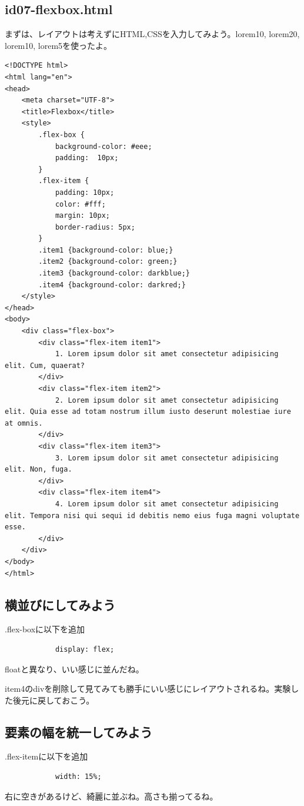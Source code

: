 \documentclass[mingoth,11pt,a4j,uplatex,dvipdfmx]{jsarticle}
\begin{document}
\subsection{id07-flexbox.html}
まずは、レイアウトは考えずにHTML,CSSを入力してみよう。lorem10, lorem20, lorem10, lorem5を使ったよ。
\begin{lstlisting}
<!DOCTYPE html>
<html lang="en">
<head>
    <meta charset="UTF-8">
    <title>Flexbox</title>
    <style>
        .flex-box {
            background-color: #eee;
            padding:  10px;
        }
        .flex-item {
            padding: 10px;
            color: #fff;
            margin: 10px;
            border-radius: 5px;
        }
        .item1 {background-color: blue;}
        .item2 {background-color: green;}
        .item3 {background-color: darkblue;}
        .item4 {background-color: darkred;}
    </style>
</head>
<body>
    <div class="flex-box">
        <div class="flex-item item1">
            1. Lorem ipsum dolor sit amet consectetur adipisicing elit. Cum, quaerat?
        </div>
        <div class="flex-item item2">
            2. Lorem ipsum dolor sit amet consectetur adipisicing elit. Quia esse ad totam nostrum illum iusto deserunt molestiae iure at omnis.
        </div>
        <div class="flex-item item3">
            3. Lorem ipsum dolor sit amet consectetur adipisicing elit. Non, fuga.
        </div>
        <div class="flex-item item4">
            4. Lorem ipsum dolor sit amet consectetur adipisicing elit. Tempora nisi qui sequi id debitis nemo eius fuga magni voluptate esse.
        </div>
    </div>
</body>
</html>
\end{lstlisting}

\subsection{横並びにしてみよう}
.flex-boxに以下を追加
\begin{lstlisting}
            display: flex;
\end{lstlisting}
floatと異なり、いい感じに並んだね。

item4のdivを削除して見てみても勝手にいい感じにレイアウトされるね。実験した後元に戻しておこう。

\subsection{要素の幅を統一してみよう}
.flex-itemに以下を追加
\begin{lstlisting}
            width: 15%;
\end{lstlisting}
右に空きがあるけど、綺麗に並ぶね。高さも揃ってるね。
\end{document}

